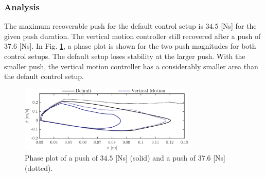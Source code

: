 \documentclass[letterpaper, 10 pt, conference]{ieeeconf}  %
\begin{document}
\subsubsection{Analysis}
The maximum recoverable push for the default control setup is $34.5$ [Ns] for the given push duration. The vertical motion controller still recovered after a push of $37.6$ [Ns]. In Fig. \ref{fig:valcomparephase}, a phase plot is shown for the two push magnitudes for both control setups. The default setup loses stability at the larger push. With the smaller push, the vertical motion controller has a considerably smaller area than the default control setup.
\begin{figure}[h]
      \centering
      \includegraphics[width=3.3in]{valcomparephase.png}
      \caption{Phase plot of a push of $34.5$ [Ns] (solid) and a push of $37.6$ [Ns] (dotted).}
      \label{fig:valcomparephase}
\end{figure}
\end{document}
